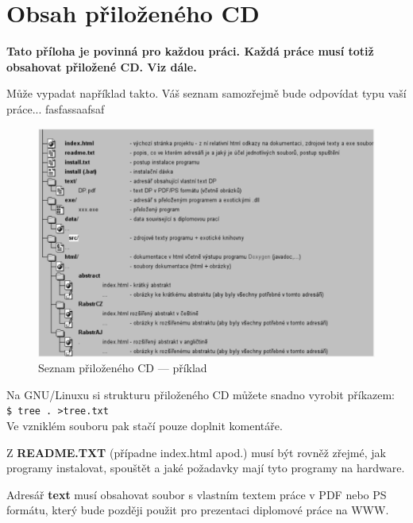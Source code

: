 \documentclass[11pt,twoside,a4paper]{book}
\begin{document}
\chapter{Obsah přiloženého CD}
\textbf{\large Tato příloha je povinná pro každou práci. Každá práce musí totiž obsahovat přiložené CD. Viz dále.}

Může vypadat například takto. Váš seznam samozřejmě bude odpovídat typu vaší práce... \cite{TurecekThesis2011} fasfassaafsaf

\begin{figure}[h]
\begin{center}
\includegraphics[width=14cm]{figures/seznamcd}
\caption{Seznam přiloženého CD --- příklad}
\label{fig:seznamcd}
\end{center}
\end{figure}

Na GNU/Linuxu si strukturu přiloženého CD můžete snadno vyrobit příkazem:\\ 
\verb|$ tree . >tree.txt|\\
Ve vzniklém souboru pak stačí pouze doplnit komentáře.

Z \textbf{README.TXT} (případne index.html apod.)  musí být rovněž zřejmé, jak programy instalovat, spouštět a jaké požadavky mají tyto programy na hardware.

Adresář \textbf{text}  musí obsahovat soubor s vlastním textem práce v PDF nebo PS formátu, který bude později použit pro prezentaci diplomové práce na WWW.
\end{document}
